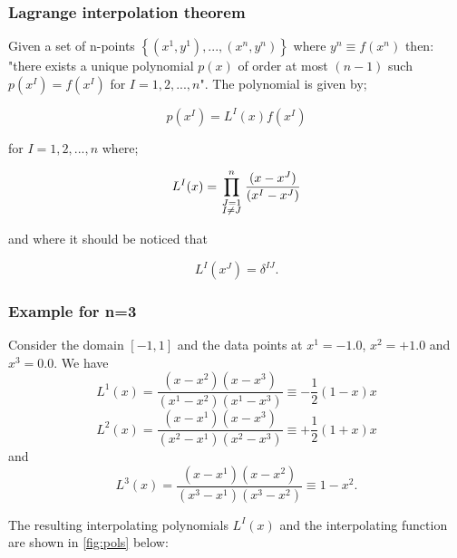 \subsubsection{Lagrange interpolation theorem}
Given a set of n-points $\left\{ {({x^1},{y^1}),...,({x^n},{y^n})} \right\}$ where ${y^n} \equiv f({x^n})$ then: "there exists a unique polynomial $p(x)$ of order at most $(n-1)$ such $p({x^I}) = f({x^I})$ for $I=1,2,...,n$". The polynomial is given by;

\begin{equation}
p({x^I}) = {L^I}(x)f({x^I})
\label{pol}
\end{equation}

for $I=1,2,...,n$ where;

\begin{equation}
{L^I}(x) = \prod\limits_{\scriptstyle J = 1\hfill\atop
\scriptstyle I \ne J\hfill}^n {\frac{{(x - {x^J})}}{{({x^I} - {x^J})}}}
\label{coef}
\end{equation}

and where it should be noticed that

\[{L^I}({x^J}) = {\delta ^{IJ}}.\]

\subsubsection*{Example for n=3}

Consider the domain $[ - 1,1]$ and the data points at ${x^1} =  - 1.0$, ${x^2} =  + 1.0$ and ${x^3} = 0.0$. We have
\[{L^1}(x) = \frac{{\left( {x - {x^2}} \right)\left( {x - {x^3}} \right)}}{{\left( {{x^1} - {x^2}} \right)\left( {{x^1} - {x^3}} \right)}} \equiv  - \frac{1}{2}\left( {1 - x} \right)x\]
\[{L^2}(x) = \frac{{\left( {x - {x^1}} \right)\left( {x - {x^3}} \right)}}{{\left( {{x^2} - {x^1}} \right)\left( {{x^2} - {x^3}} \right)}} \equiv  + \frac{1}{2}\left( {1 + x} \right)x\]
and
\[{L^3}(x) = \frac{{\left( {x - {x^1}} \right)\left( {x - {x^2}} \right)}}{{\left( {{x^3} - {x^1}} \right)\left( {{x^3} - {x^2}} \right)}} \equiv 1 - {x^2}.\]

The resulting interpolating polynomials ${L^I}(x)$ and the interpolating function  are shown in \cref{fig:pols} below:

